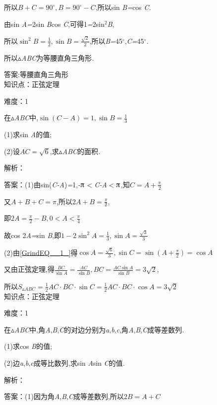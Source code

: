 \documentclass{article} %
\begin{document}
所以$B+C=90^{\circ},B=90^{\circ}-C$,所以sin \textit{B=}cos \textit{C.}

由sin \textit{A=}2sin \textit{B}cos \textit{C},可得1\textit{=}2sin${}^{2}$\textit{B},

所以$\sin^2 B=\frac{1}{2},\sin B=\frac{\sqrt{2}}{2}$,所以\textit{B=}45$\mathrm{{}^\circ}$,\textit{C=}45$\mathrm{{}^\circ}$\textit{.}

所以$\mathrm{\vartriangle}$\textit{ABC}为等腰直角三角形\textit{.}

 答案:等腰直角三角形 \\

知识点：正弦定理

难度：1

 在$\mathrm{\vartriangle}$\textit{ABC}中,$\sin (C-A)=1,\sin B=\frac{1}{3}$

 (1)求sin \textit{A}的值;

 (2)设$AC=\sqrt{6}$,求$\mathrm{\vartriangle}$\textit{ABC}的面积\textit{.}

解析：

 答案：(1)由sin(\textit{C-A})\textit{=}1,\textit{-}$\piup$\textit{$<$C-A$<$}$\piup$,知$C=A+\frac{\pi}{2}$

又$A+B+C=\pi$,所以$2A+B=\frac{\pi}{2}$,

即$2A=\frac{\pi}{2}-B,0<A<\frac{\pi}{4}$

故cos 2\textit{A=}sin \textit{B},即$1-2\sin^2 A=\frac{1}{3},\sin A=\frac{\sqrt{3}}{3}$

(2)由\eqref{GrindEQ__1_}得$\cos A=\frac{\sqrt{6}}{3},\sin C=\sin (A+\frac{\pi}{2})=\cos A$

又由正弦定理,得$\frac{BC}{\sin A}=\frac{AC}{\sin B},BC=\frac{AC\sin A}{\sin B}=3\sqrt{2}$,

所以$S_{\vartriangle ABC}=\frac{1}{2}AC\cdot BC\cdot \sin C=\frac{1}{2}AC\cdot BC\cdot \cos A=3\sqrt{2}$ \\

知识点：正弦定理

难度：1

 在$\mathrm{\vartriangle}$\textit{ABC}中,角\textit{A},\textit{B},\textit{C}的对边分别为\textit{a},\textit{b},\textit{c},角\textit{A},\textit{B},\textit{C}成等差数列\textit{.}

 (1)求cos \textit{B}的值;

 (2)边\textit{a},\textit{b},\textit{c}成等比数列,求sin \textit{A}sin \textit{C}的值\textit{.}

解析：

 答案：(1)因为角\textit{A},\textit{B},\textit{C}成等差数列,所以$2B=A+C$
\end{document}
